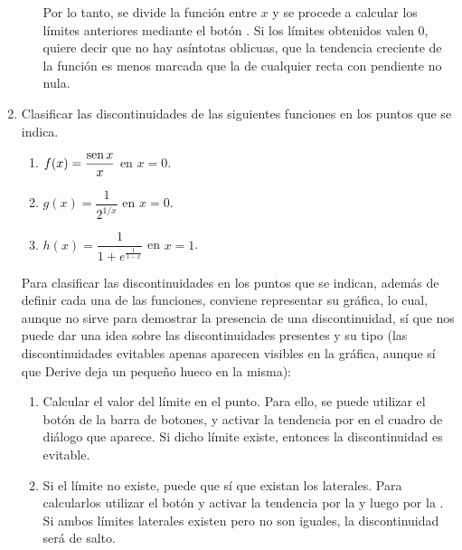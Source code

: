 \begin{enumerate}[leftmargin=*]
\begin{enumerate}
\begin{indicacion}
{Por lo tanto, se divide la función entre $x$ y se procede a calcular
los límites anteriores mediante el botón .
Si los límites obtenidos valen 0, quiere decir que no hay asíntotas
oblicuas, que la tendencia creciente de la función es menos marcada
que la de cualquier recta con pendiente no nula. }
\end{indicacion}

\end{enumerate}

\item  Clasificar las discontinuidades de las siguientes funciones en los puntos que se indica.
\begin{multicols}{2}
\begin{enumerate}
\item  $f(x)=\dfrac{\mathop{\rm sen}\nolimits x}{x}$ en $x=0$.

\item $g(x)=\dfrac{1}{2^{1/x}}$ en $x=0$.

\item $h(x)=\dfrac{1}{1+e^{\frac{1}{1-x}}}$ en $x=1$.
\end{enumerate}
\end{multicols}


\begin{indicacion}
{ Para clasificar las discontinuidades en los puntos que se indican,
además de definir cada una de las funciones, conviene representar su
gráfica, lo cual, aunque no sirve para demostrar la presencia de una
discontinuidad, sí que nos puede dar una idea sobre las
discontinuidades presentes y su tipo (las discontinuidades evitables
apenas aparecen visibles en la gráfica, aunque sí que Derive deja un
pequeño hueco en la misma):

\begin{enumerate}

\item Calcular el valor del límite en el punto. Para ello, se puede
utilizar el botón  de la barra de botones,
y activar la tendencia por  en el cuadro de diálogo
que aparece. Si dicho límite existe, entonces la discontinuidad es
evitable.

\item Si el límite no existe, puede que sí que existan los
laterales. Para calcularlos utilizar el botón  y activar la tendencia por la  y luego por
la . Si ambos límites laterales existen pero no son
iguales, la discontinuidad será de salto.


\end{enumerate}}
\end{indicacion}
\end{enumerate}
